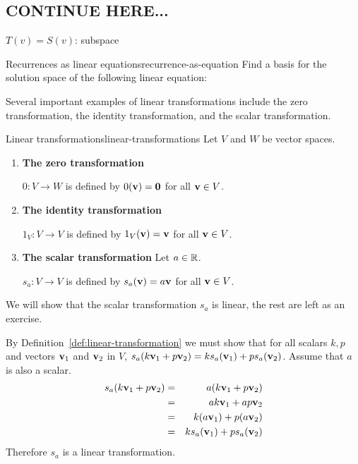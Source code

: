 
\subsection{CONTINUE HERE...}

$T(v) = S(v)$: subspace

\begin{example}{Recurrences as linear equations}{recurrence-as-equation}
  Find a basis for the solution space of the following linear
  equation:
  
\end{example}

Several important examples of linear transformations include the zero
transformation, the identity transformation, and the scalar
transformation.

\begin{example}{Linear transformations}{linear-transformations}
  Let $V$ and $W$ be vector spaces.

  \begin{enumerate}
  \item \textbf{The zero transformation}

    $0:V\to W$ is defined by $0(\mbox{\bf v})=\mbox{\bf 0}$ for all
    $\mbox{\bf v}\in V$.

  \item \textbf{The identity transformation}

    $1_V:V\to V$ is defined by $1_V(\mbox{\bf v})=\mbox{\bf v}$ for all
    $\mbox{\bf v}\in V$.

  \item \textbf{The scalar transformation} Let $a\in\mathbb{R}$.

    $s_a:V\to V$ is defined by $s_a(\mbox{\bf v})=a\mbox{\bf v}$ for all
    $\mbox{\bf v}\in V$.
  \end{enumerate}
\end{example}

\begin{solution}
  We will show that the scalar transformation $s_a$ is linear, the
  rest are left as an exercise.

  By Definition~\ref{def:linear-transformation} we must show that for
  all scalars $k ,p $ and vectors $\mbox{\bf v}_1$ and $\mbox{\bf v}_2$ in
  $V$,
  $s_a(k \mbox{\bf v}_1 + p \mbox{\bf v}_2) = k s_a(\mbox{\bf v}_1)+ p
  s_a(\mbox{\bf v}_{2})$. Assume that $a$ is also a scalar.
  \begin{eqnarray*}
    s_a(k \mbox{\bf v}_1 + p \mbox{\bf v}_2)
    &=& a (k \mbox{\bf v}_1 + p \mbox{\bf v}_2) \\
    &=&  ak \mbox{\bf v}_1 + ap \mbox{\bf v}_2  \\
    &=&  k (a \mbox{\bf v}_1) + p(a \mbox{\bf v}_2)  \\
    &=& k s_a(\mbox{\bf v}_1)  + p s_a (\mbox{\bf v}_2)
  \end{eqnarray*}
  Therefore $s_a$ is a linear transformation.
\end{solution}

